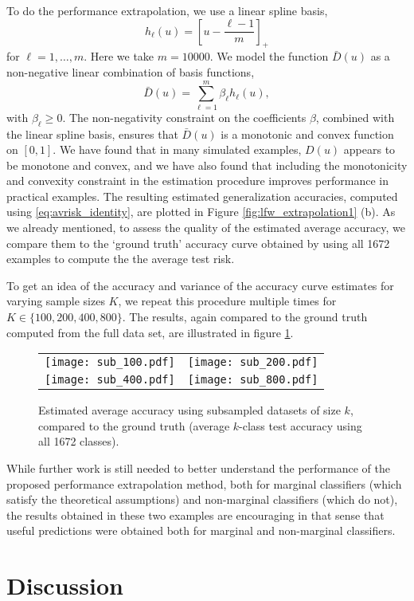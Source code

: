 \documentclass[12pt]{article}
\begin{document}
To do the performance extrapolation, we use a linear
spline basis,
\[
h_\ell(u) = \left[u - \frac{\ell - 1}{m}\right]_+
\]
for $\ell = 1,\hdots, m$.  Here we take $m = 10000$.  We model the
function $\bar{D}(u)$ as a non-negative linear combination of basis
functions,
\[
\bar{D}(u) = \sum_{\ell = 1}^m \beta_\ell h_\ell(u),
\]
with $\beta_\ell \geq 0$.  The non-negativity constraint on the
coefficients $\beta$, combined with the linear spline basis, ensures
that $\bar{D}(u)$ is a monotonic and convex function on $[0,1]$.  We
have found that in many simulated examples, $D(u)$ appears to be
monotone and convex, and we have also found that including the
monotonicity and convexity constraint in the estimation procedure
improves performance in practical examples.  The resulting estimated
generalization accuracies, computed using \eqref{eq:avrisk_identity},
are plotted in Figure \eqref{fig:lfw_extrapolation1} (b).  As we
already mentioned, to assess the quality of the estimated average
accuracy, we compare them to the `ground truth' accuracy curve
obtained by using all 1672 examples to compute the the average test
risk.




To get an idea of the accuracy and variance of the accuracy curve
estimates for varying sample sizes $K$, we repeat this procedure
multiple times for $K \in \{100,200,400, 800\}$.  The results, again
compared to the ground truth computed from the full data set, are
illustrated in figure \ref{fig:lfw_extrapolation2}.

\begin{figure}
\centering
\begin{tabular}{cc}
\texttt{[image: sub\_100.pdf]} &
\texttt{[image: sub\_200.pdf]} \\
\texttt{[image: sub\_400.pdf]} &
\texttt{[image: sub\_800.pdf]} 
\end{tabular}
\caption{Estimated average accuracy using subsampled datasets of size
  $k$, compared to the ground truth (average $k$-class test accuracy
  using all 1672 classes).}
\label{fig:lfw_extrapolation2}
\end{figure}


While further work is still needed to better understand the
performance of the proposed performance extrapolation method, both for
marginal classifiers (which satisfy the theoretical assumptions) and
non-marginal classifiers (which do not), the results obtained in these
two examples are encouraging in that sense that useful predictions
were obtained both for marginal and non-marginal classifiers.

\section{Discussion}

\printbibliography[heading=bibintoc]
\end{document}
